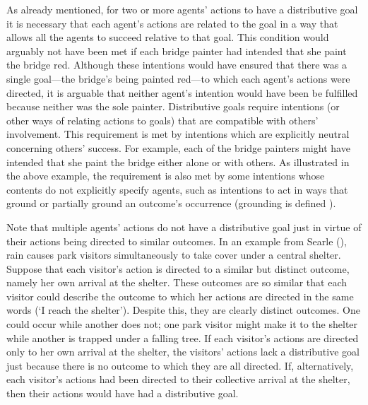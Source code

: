 \documentclass[12pt,a4paper]{extarticle}
\begin{document}
As already mentioned, for two or more agents' actions to have a distributive goal it is necessary that each agent's actions are related to the goal in a way that allows all the agents to succeed relative to that goal.  
This condition would arguably not have been met if each bridge painter had intended that she paint the bridge red.
Although these intentions would have ensured that there was a single goal---the bridge's being painted red---to which each agent's actions were directed, it is arguable that neither agent's intention would have been be fulfilled because neither was the sole painter.
Distributive goals require intentions (or other ways of relating actions to goals) that are compatible with others' involvement.
This requirement is met by intentions which are explicitly neutral concerning others' success.  
For example, each of the bridge painters might have intended that she paint the bridge either alone or with others.
As illustrated in the above example, the requirement is also met by some intentions whose contents do not explicitly specify agents, such as intentions to act in ways that ground or partially ground an outcome's occurrence (grounding is defined ).


Note that multiple agents' actions do not have a distributive goal just in virtue of their actions being directed to similar outcomes.  
In an example from Searle (\citeyear[p.\ 92]{Searle:1990em}), rain causes park visitors simultaneously to take cover under a central shelter.  
Suppose that each visitor's action is directed to a similar but distinct outcome, namely her own arrival at the shelter.  
These outcomes are so similar that each visitor could describe the outcome to which her actions are directed in the same words (`I reach the shelter').
Despite this, they are clearly distinct outcomes.
One could occur while another does not; 
one park visitor might make it to the shelter while another is trapped under a falling tree.
If each visitor's actions are directed only to her own arrival at the shelter, the visitors' actions lack a distributive goal just because there is no outcome to which they are all directed.
If, alternatively, each visitor's actions had been directed to their collective arrival at the shelter, then their actions would have had a distributive goal.
\end{document}
